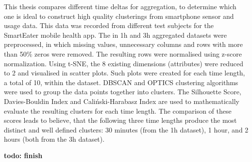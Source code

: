 
This thesis compares different time deltas for aggregation, to determine which one is ideal to construct high quality clusterings from smartphone sensor and usage data. This data was recorded from different test subjects for the SmartEater mobile health app. The in 1h and 3h aggregated datasets were preprocessed, in which missing values, unnecessary columns and rows with more than 50\% zeros were removed. The resulting rows were normalised using z-score normalization. Using t-SNE, the 8 existing dimensions (attributes) were reduced to 2 and visualised in scatter plots. Such plots were created for each time length, a total of 10, within the dataset. DBSCAN and OPTICS clustering algorithms were used to group the data points together into clusters. The Silhouette Score, Davies-Bouldin Index and Caliński-Harabasz Index are used to mathematically evaluate the resulting clusters for each time length. The comparison of these scores leads to believe, that the following three time lengths produce the most distinct and well defined clusters:
30 minutes (from the 1h dataset), 1 hour, and 2 hours (both from the 3h dataset).






\textbf{todo: finish}
